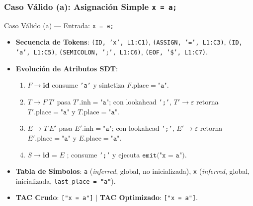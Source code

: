 \documentclass[11pt, letterpaper]{article}
\begin{document}
\subsubsection{Caso Válido (a): Asignación Simple \texttt{x = a;}}
\begin{tracebox}{Caso Válido (a) --- Entrada: \texttt{x = a;}}
\begin{itemize}[leftmargin=1.5em, itemsep=2pt]
    \item \textbf{Secuencia de Tokens}: \texttt{(ID, 'x', L1:C1)}, \texttt{(ASSIGN, '=', L1:C3)}, \texttt{(ID, 'a', L1:C5)}, \texttt{(SEMICOLON, ';', L1:C6)}, \texttt{(EOF, '\$', L1:C7)}.
    \item \textbf{Evolución de Atributos SDT}:
    \begin{enumerate}[leftmargin=1.5em]
        \item $F \rightarrow \textbf{id}$ consume \texttt{'a'} y sintetiza $F.\text{place} = \texttt{"a"}$.
        \item $T \rightarrow F\ T'$ pasa $T'.\text{inh} = \texttt{"a"}$; con lookahead \texttt{';'}, $T' \rightarrow \varepsilon$ retorna $T'.\text{place} = \texttt{"a"}$ y $T.\text{place} = \texttt{"a"}$.
        \item $E \rightarrow T\ E'$ pasa $E'.\text{inh} = \texttt{"a"}$; con lookahead \texttt{';'}, $E' \rightarrow \varepsilon$ retorna $E'.\text{place} = \texttt{"a"}$ y $E.\text{place} = \texttt{"a"}$.
        \item $S \rightarrow \textbf{id = } E \textbf{ ;}$ consume \texttt{';'} y ejecuta $\texttt{emit("x = a")}$.
    \end{enumerate}
    \item \textbf{Tabla de Símbolos}: \texttt{a} (\textit{inferred}, global, no inicializada), \texttt{x} (\textit{inferred}, global, inicializada, \texttt{last\_place = "a"}).
    \item \textbf{TAC Crudo}: \texttt{["x = a"]} \quad $|$ \quad \textbf{TAC Optimizado}: \texttt{["x = a"]}.
\end{itemize}
\end{tracebox}

\end{document}
